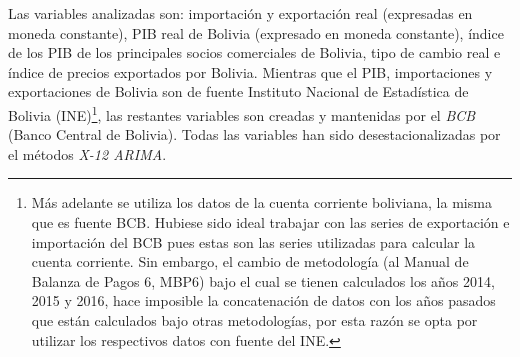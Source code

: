 \documentclass[12pt,letterpaper]{article}
\begin{document}
Las variables analizadas son: importación y exportación real (expresadas en moneda constante), PIB real de Bolivia (expresado en moneda constante), índice de los PIB de los principales socios comerciales de Bolivia, tipo de cambio real e índice de precios exportados por Bolivia. Mientras que el PIB, importaciones y exportaciones de Bolivia son de fuente Instituto Nacional de Estadística de Bolivia (INE)\footnote{Más adelante se utiliza los datos de la cuenta corriente boliviana, la misma que es fuente BCB. Hubiese sido ideal trabajar con las series de exportación e importación del BCB pues estas son las series utilizadas para calcular la cuenta corriente. Sin embargo, el cambio de metodología (al Manual de Balanza de Pagos 6, MBP6) bajo el cual se tienen calculados los años 2014, 2015 y 2016, hace imposible la concatenación de datos con los años pasados que están calculados bajo otras metodologías, por esta razón se opta por utilizar los respectivos datos con fuente del INE.}, las restantes variables son creadas y mantenidas por el \emph{BCB} (Banco Central de Bolivia). Todas las variables han sido desestacionalizadas por el métodos \emph{X-12 ARIMA}.
\end{document}
